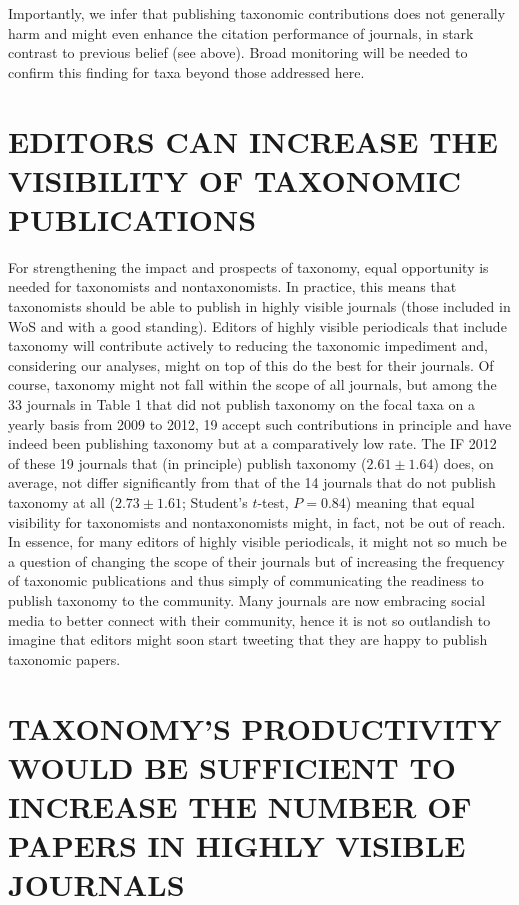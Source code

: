 \documentclass[webpdf,PV,mynatbib,surname,CE,MSC]{SYS-PV}
\begin{document}
Importantly, we infer that publishing taxonomic contributions does not generally harm and might
even enhance the citation performance of journals, in stark contrast to previous belief (see
above). Broad monitoring will be needed to confirm this finding for taxa beyond those addressed
here.

\section*{E{\sc DITORS} C{\sc AN} I{\sc NCREASE THE} V{\sc ISIBILITY OF}
T{\sc AXONOMIC} P{\sc UBLICATIONS}}

For strengthening the impact and prospects of taxonomy, equal opportunity is needed for
taxonomists and nontaxonomists. In practice, this means that taxonomists should be able to publish
in highly visible journals (those included in WoS and with a good standing). Editors of highly
visible periodicals that include taxonomy will contribute actively to reducing the taxonomic
impediment and, considering our analyses, might on top of this do the best for their journals. Of
course, taxonomy might not fall within the scope of all journals, but among the 33 journals in
Table 1 that did not publish taxonomy on the focal taxa on a yearly basis from 2009 to 2012, 19
accept such contributions in principle and have indeed been publishing taxonomy but at a
comparatively low rate. The IF 2012 of these 19 journals that (in principle) publish taxonomy
($2.61\pm 1.64$) does, on average, not differ significantly from that of the 14 journals that do
not publish taxonomy at all ($2.73\pm 1.61$; Student's $t$-test, $P=0.84$) meaning that equal
visibility for taxonomists and nontaxonomists might, in fact, not be out of reach. In essence, for
many editors of highly visible periodicals, it might not so much be a question of changing the
scope of their journals but of increasing the frequency of taxonomic publications and thus simply
of communicating the readiness to publish taxonomy to the community. Many journals are now
embracing social media to better connect with their community, hence it is not so outlandish to
imagine that editors might soon start tweeting that they are happy to publish taxonomic papers.

\section*{T{\sc AXONOMY'S} P{\sc RODUCTIVITY} W{\sc OULD BE} S{\sc UFFICIENT
TO} I{\sc NCREASE THE} N{\sc UMBER OF} P{\sc APERS IN} H{\sc IGHLY} V{\sc ISIBLE} J{\sc OURNALS}}
\end{document}
